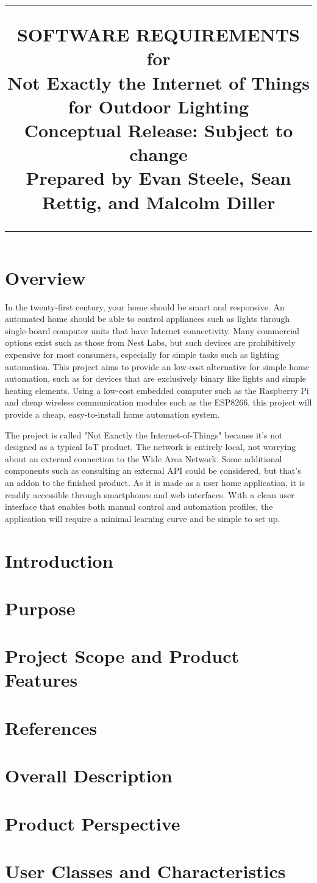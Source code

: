 \documentclass[oneside,openright]{scrreprt}
\title{
	\flushright
		\rule{16cm}{5pt}\vskip1cm
		\Huge{SOFTWARE REQUIREMENTS}\\
		\vspace{2cm}
	for\\
		\vspace{2cm}
	Not Exactly the Internet of Things for Outdoor Lighting\\
		\vspace{2cm}
	\LARGE{Conceptual Release:}
	\vspace{2cm}
	\LARGE{Subject to change\\}
	\vspace{2cm}
	Prepared by Evan Steele, Sean Rettig, and Malcolm Diller\\
		\vfill
		\rule{16cm}{5pt}
}
\date{}
\begin{document}
\maketitle
\tableofcontents
\newpage

\section{Overview}

In the twenty-first century, your home should be smart and responsive. An
automated home should be able to control appliances such as lights through
single-board computer units that have Internet connectivity. Many commercial
options exist such as those from Nest Labs, but such devices are prohibitively
expensive for most consumers, especially for simple tasks such as lighting
automation. This project aims to provide an low-cost alternative for simple
home automation, such as for devices that are exclusively binary like lights
and simple heating elements. Using a low-cost embedded computer such as the
Raspberry Pi and cheap wireless communication modules such as the ESP8266, this
project will provide a cheap, easy-to-install home automation system.

The project is called "Not Exactly the Internet-of-Things" because it's not
designed as a typical IoT product. The network is entirely local, not worrying
about an external connection to the Wide Area Network. Some additional
components such as consulting an external API could be considered, but that's
an addon to the finished product. As it is made as a user home application, it
is readily accessible through smartphones and web interfaces. With a clean user
interface that enables both manual control and automation profiles, the
application will require a minimal learning curve and be simple to set up.  

\section{Introduction}

\section{Purpose}

\section{Project Scope and Product Features}

\section{References}

\section{Overall Description}

\section{Product Perspective}

\section{User Classes and Characteristics}

\end{document}
